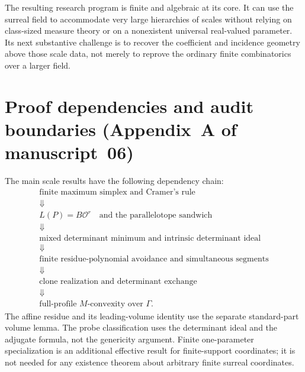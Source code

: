 \documentclass[11pt,a4paper]{article}
\numberwithin{equation}{section}
\theoremstyle{plain}
\newcommand{\OO}{\mathcal O}
\begin{document}
The resulting research program is finite and algebraic at its core.
It can use the surreal field to accommodate very large hierarchies of
scales without relying on class-sized measure theory or on a nonexistent
universal real-valued parameter. Its next substantive challenge is to
recover the coefficient and incidence geometry above those scale data,
not merely to reprove the ordinary finite combinatorics over a larger field.

\section{Proof dependencies and audit boundaries (Appendix~A of manuscript~06)}
\label{poly:mv:app:audit}

The main scale results have the following dependency chain:
\[
\begin{gathered}
 \text{finite maximum simplex and Cramer's rule}\\
 \Downarrow\\
 L(P)=B\OO^r\quad\text{and the parallelotope sandwich}\\
 \Downarrow\\
 \text{mixed determinant minimum and intrinsic determinant ideal}\\
 \Downarrow\\
 \text{finite residue-polynomial avoidance and simultaneous segments}\\
 \Downarrow\\
 \text{clone realization and determinant exchange}\\
 \Downarrow\\
 \text{full-profile }M\text{-convexity over }\Gamma.
\end{gathered}
\]
The affine residue and its leading-volume identity use the separate
standard-part volume lemma. The probe classification uses the determinant
ideal and the adjugate formula, not the genericity argument. Finite
one-parameter specialization is an additional effective result for
finite-support coordinates; it is not needed for any existence theorem
about arbitrary finite surreal coordinates.
\end{document}
